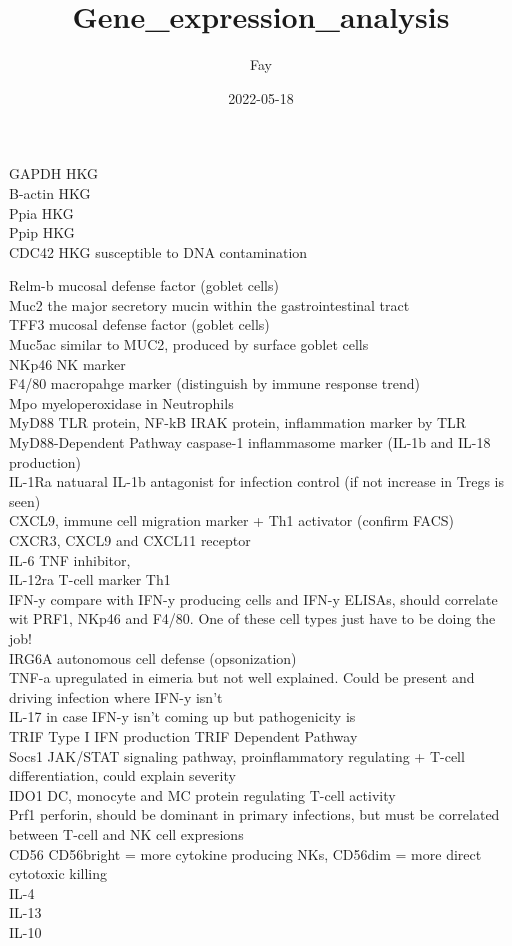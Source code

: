 \documentclass[
]{article}
\title{Gene\_expression\_analysis}
\author{Fay}
\date{2022-05-18}
\begin{document}
\maketitle

GAPDH HKG\\
B-actin HKG\\
Ppia HKG\\
Ppip HKG\\
CDC42 HKG susceptible to DNA contamination

Relm-b mucosal defense factor (goblet cells)\\
Muc2 the major secretory mucin within the gastrointestinal tract\\
TFF3 mucosal defense factor (goblet cells)\\
Muc5ac similar to MUC2, produced by surface goblet cells\\
NKp46 NK marker\\
F4/80 macropahge marker (distinguish by immune response trend)\\
Mpo myeloperoxidase in Neutrophils\\
MyD88 TLR protein, NF-kB IRAK protein, inflammation marker by TLR
MyD88-Dependent Pathway caspase-1 inflammasome marker (IL-1b and IL-18
production)\\
IL-1Ra natuaral IL-1b antagonist for infection control (if not increase
in Tregs is seen)\\
CXCL9, immune cell migration marker + Th1 activator (confirm FACS)\\
CXCR3, CXCL9 and CXCL11 receptor\\
IL-6 TNF inhibitor,\\
IL-12ra T-cell marker Th1\\
IFN-y compare with IFN-y producing cells and IFN-y ELISAs, should
correlate wit PRF1, NKp46 and F4/80. One of these cell types just have
to be doing the job!\\
IRG6A autonomous cell defense (opsonization)\\
TNF-a upregulated in eimeria but not well explained. Could be present
and driving infection where IFN-y isn't\\
IL-17 in case IFN-y isn't coming up but pathogenicity is\\
TRIF Type I IFN production TRIF Dependent Pathway\\
Socs1 JAK/STAT signaling pathway, proinflammatory regulating + T-cell
differentiation, could explain severity\\
IDO1 DC, monocyte and MC protein regulating T-cell activity\\
Prf1 perforin, should be dominant in primary infections, but must be
correlated between T-cell and NK cell expresions\\
CD56 CD56bright = more cytokine producing NKs, CD56dim = more direct
cytotoxic killing\\
IL-4\\
IL-13\\
IL-10
\end{document}
